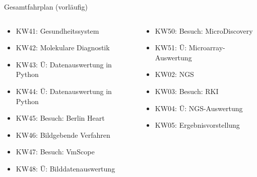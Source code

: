 \documentclass[aspectratio=169,t]{beamer}
\begin{document}
\begin{frame}{Gesamtfahrplan (vorläufig)}
  \begin{columns}
   \begin{column}{0.5\textwidth}
  \begin{itemize}
    \item KW41: Gesundheitssystem
    \item KW42: Molekulare Diagnostik %
    \item KW43: Ü: Datenauswertung in Python
    \item KW44: Ü: Datenauswertung in Python
    \item KW45: Besuch: Berlin Heart
    \item KW46: Bildgebende Verfahren
    \item KW47: Besuch: VmScope
    \item KW48: Ü: Bilddatenauswertung
  \end{itemize}
   \end{column}
   \begin{column}{0.5\textwidth}
  \begin{itemize}
    \item KW50: Besuch: MicroDiscovery
    \item KW51: Ü: Microarray-Auswertung
    \item KW02: NGS
    \item KW03: Besuch: RKI
    \item KW04: Ü: NGS-Auswertung
    \item KW05: Ergebnisvorstellung
  \end{itemize}
   \end{column}
  \end{columns}
   
\end{frame}
\end{document}
